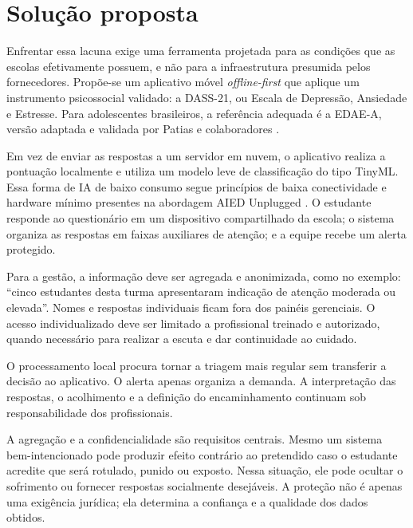 \section{Solução proposta}

Enfrentar essa lacuna exige uma ferramenta projetada para as condições que as
escolas efetivamente possuem, e não para a infraestrutura presumida pelos
fornecedores. Propõe-se um aplicativo móvel \emph{offline-first} que aplique um
instrumento psicossocial validado: a DASS-21, ou Escala de Depressão, Ansiedade
e Estresse. Para adolescentes brasileiros, a referência adequada é a EDAE-A,
versão adaptada e validada por Patias e colaboradores \cite{patias2016}.

Em vez de enviar as respostas a um servidor em nuvem, o aplicativo realiza a
pontuação localmente e utiliza um modelo leve de classificação do tipo TinyML.
Essa forma de IA de baixo consumo segue princípios de baixa conectividade e
hardware mínimo presentes na abordagem AIED Unplugged \cite{uema2026}. O
estudante responde ao questionário em um dispositivo compartilhado da escola; o
sistema organiza as respostas em faixas auxiliares de atenção; e a equipe recebe
um alerta protegido.

Para a gestão, a informação deve ser agregada e anonimizada, como no exemplo:
``cinco estudantes desta turma apresentaram indicação de atenção moderada ou
elevada''. Nomes e respostas individuais ficam fora dos painéis gerenciais. O
acesso individualizado deve ser limitado a profissional treinado e autorizado,
quando necessário para realizar a escuta e dar continuidade ao cuidado.

O processamento local procura tornar a triagem mais regular sem transferir a
decisão ao aplicativo. O alerta apenas organiza a demanda. A interpretação das
respostas, o acolhimento e a definição do encaminhamento continuam sob
responsabilidade dos profissionais.

A agregação e a confidencialidade são requisitos centrais. Mesmo um sistema
bem-intencionado pode produzir efeito contrário ao pretendido caso o estudante
acredite que será rotulado, punido ou exposto. Nessa situação, ele pode ocultar
o sofrimento ou fornecer respostas socialmente desejáveis. A proteção não é
apenas uma exigência jurídica; ela determina a confiança e a qualidade dos dados
obtidos.


